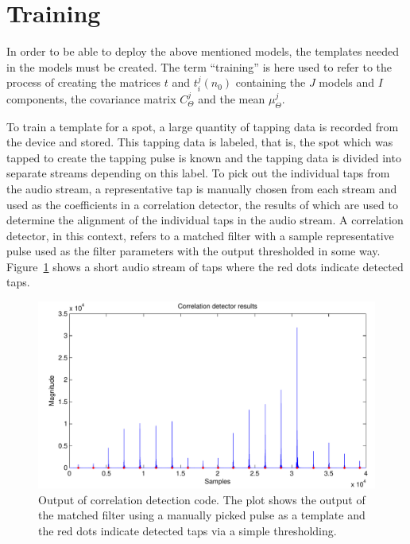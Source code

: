 \section{Training}\label{sec:APRtraining}
In order to be able to deploy the above mentioned models, the templates needed in the models must be created. The term ``training'' is here used to refer to the process of creating the matrices $t$ and $t^j_i(n_0)$ containing the $J$ models and $I$ components, the covariance matrix $C^j_\Theta$ and the mean $\mu^j_\Theta$.

To train a template for a spot, a large quantity of tapping data is recorded from the device and stored. This tapping data is labeled, that is, the spot which was tapped to create the tapping pulse is known and the tapping data is divided into separate streams depending on this label. To pick out the individual taps from the audio stream, a representative tap is manually chosen from each stream and used as the coefficients in a correlation detector, the results of which are used to determine the alignment of the individual taps in the audio stream. A correlation detector, in this context, refers to a matched filter with a sample representative pulse used as the filter parameters with the output thresholded in some way. Figure~\ref{fig:correlationDetect} shows a short audio stream of taps where the red dots indicate detected taps.

\begin{figure}[!]
\centering
\includegraphics[width=150mm]{correlationDetect.pdf}
\caption{Output of correlation detection code. The plot shows the output of the matched filter using a manually picked pulse as a template and the red dots indicate detected taps via a simple thresholding.}\label{fig:correlationDetect}
\end{figure}

